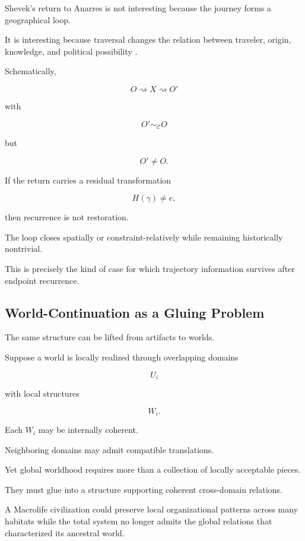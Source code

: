\documentclass[
  11pt,
  a4paper,
  DIV=12,
  BCOR=0mm,
  parskip=half-
]{scrartcl}
\theoremstyle{definition}
\theoremstyle{plain}
\theoremstyle{remark}
\begin{document}
Shevek's return to Anarres is not interesting because the journey forms a
geographical loop.

It is interesting because traversal changes the relation between traveler,
origin, knowledge, and political possibility \cite{leguin1974}.

Schematically,

\[
  O
  \rightsquigarrow
  X
  \rightsquigarrow
  O'
\]

with

\[
  O'\sim_{\mathcal C}O
\]

but

\[
  O'\neq O.
\]

If the return carries a residual transformation

\[
  H(\gamma)\neq e,
\]

then recurrence is not restoration.

The loop closes spatially or constraint-relatively while remaining
historically nontrivial.

This is precisely the kind of case for which trajectory information survives
after endpoint recurrence.


\subsection{World-Continuation as a Gluing Problem}
\label{app:world-gluing}

The same structure can be lifted from artifacts to worlds.

Suppose a world is locally realized through overlapping domains

\[
  U_i
\]

with local structures

\[
  W_i.
\]

Each \(W_i\) may be internally coherent.

Neighboring domains may admit compatible translations.

Yet global worldhood requires more than a collection of locally acceptable
pieces.

They must glue into a structure supporting coherent cross-domain relations.

A Macrolife civilization could preserve local organizational patterns across
many habitats while the total system no longer admits the global relations
that characterized its ancestral world.
\end{document}
